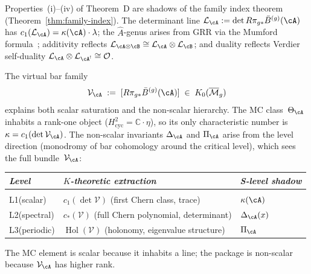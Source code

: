 \begin{remark}\label{rem:homotopy-native-d}
Properties~(i)--(iv) of Theorem~D are shadows of the family index
theorem (Theorem~\ref{thm:family-index}).
The determinant line $\mathcal{L}_{\cA} := \det R\pi_{g*}\bar{B}^{(g)}(\cA)$
has $c_1(\mathcal{L}_{\cA}) = \kappa(\cA)\cdot\lambda$;
the $\hat{A}$-genus arises from GRR via the Mumford
formula~\cite{Mumford83}; additivity reflects
$\mathcal{L}_{\cA\otimes\cB}\cong\mathcal{L}_{\cA}\otimes\mathcal{L}_{\cB}$;
and duality reflects Verdier self-duality
$\mathcal{L}_{\cA}\otimes\mathcal{L}_{\cA^!}\cong\mathcal{O}$.
\end{remark}

\begin{remark}
\label{rem:structural-saturation}
The virtual bar family
\begin{equation}\label{eq:virtual-bar-family}
\mathcal{V}_{\cA}
\;:=\;
[R\pi_{g*} \bar{B}^{(g)}(\cA)]
\;\in\; K_0(\overline{\mathcal{M}}_g)
\end{equation}
explains both scalar saturation and the non-scalar hierarchy.
The MC class~$\Theta_{\cA}$ inhabits a rank-one object
($H^2_{\mathrm{cyc}} = \mathbb{C}\cdot\eta$), so its only
characteristic number is $\kappa = c_1(\det\mathcal{V}_{\cA})$.
The non-scalar invariants $\Delta_{\cA}$ and $\Pi_{\cA}$ arise
from the level direction (monodromy of bar cohomology around the
critical level), which sees the full bundle~$\mathcal{V}_{\cA}$:

\begin{center}\renewcommand{\arraystretch}{1.3}
\begin{tabular}{@{}lll@{}}
\emph{Level} & \emph{$K$-theoretic extraction}
  & \emph{S-level shadow} \\[2pt]
\hline
\\[-6pt]
L1\;\textup{(scalar)}
  & $c_1(\det \mathcal{V})$
    \textup{(}first Chern class, trace\textup{)}
  & $\kappa(\cA)$ \\
L2\;\textup{(spectral)}
  & $c_*(\mathcal{V})$
    \textup{(}full Chern polynomial, determinant\textup{)}
  & $\Delta_{\cA}(x)$ \\
L3\;\textup{(periodic)}
  & $\operatorname{Hol}(\mathcal{V})$
    \textup{(}holonomy, eigenvalue structure\textup{)}
  & $\Pi_{\cA}$
\end{tabular}
\end{center}
The MC element is scalar because it inhabits a line;
the package is non-scalar because $\mathcal{V}_{\cA}$ has
higher rank.
\end{remark}

